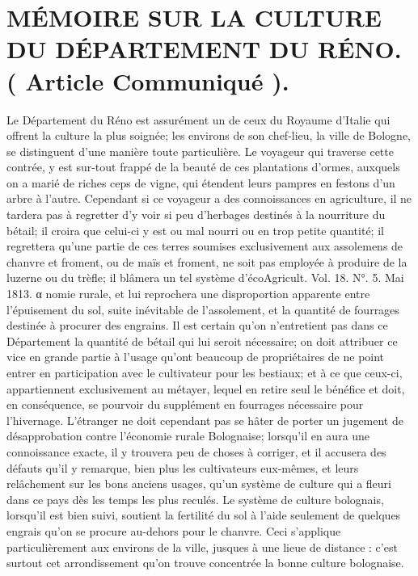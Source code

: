 \setcounter{page}{161}
\section{MÉMOIRE SUR LA CULTURE DU DÉPARTEMENT DU RÉNO. ( Article Communiqué ).}
Le Département du Réno est assurément un de ceux du Royaume d'Italie qui offrent la culture la plus soignée; les environs de son chef-lieu, la ville de Bologne, se distinguent d'une manière toute particulière. Le voyageur qui traverse cette contrée, y est sur-tout frappé de la beauté de ces plantations d'ormes, auxquels on a marié de riches ceps de vigne, qui étendent leurs pampres en festons d'un arbre à l'autre. Cependant si ce voyageur a des connoissances en agriculture, il ne tardera pas à regretter d'y voir si peu d'herbages destinés à la nourriture du bétail; il croira que celui-ci y est ou mal nourri ou en trop petite quantité; il regrettera qu'une partie de ces terres soumises exclusivement aux assolemens de chanvre et froment, ou de maïs et froment, ne soit pas employée à produire de la luzerne ou du trèfle; il blâmera un tel système d'écoAgricult. Vol. 18. N°. 5. Mai 1813. α\setcounter{page}{162} nomie rurale, et lui reprochera une disproportion apparente entre l'épuisement du sol, suite inévitable de l'assolement, et la quantité de fourrages destinée à procurer des engrains.
Il est certain qu'on n'entretient pas dans ce Département la quantité de bétail qui lui seroit nécessaire; on doit attribuer ce vice en grande partie à l'usage qu'ont beaucoup de propriétaires de ne point entrer en participation avec le cultivateur pour les bestiaux; et à ce que ceux-ci, appartiennent exclusivement au métayer, lequel en retire seul le bénéfice et doit, en conséquence, se pourvoir du supplément en fourrages nécessaire pour l'hivernage. L'étranger ne doit cependant pas se hâter de porter un jugement de désapprobation contre l'économie rurale Bolognaise; lorsqu'il en aura une connoissance exacte, il y trouvera peu de choses à corriger, et il accusera des défauts qu'il y remarque, bien plus les cultivateurs eux-mêmes, et leurs relâchement sur les bons anciens usages, qu'un système de culture qui a fleuri dans ce pays dès les temps les plus reculés. Le système de culture bolognais, lorsqu'il est bien suivi, soutient la fertilité du sol à l'aide seulement de quelques engrais qu'on se procure au-dehors pour le chanvre.\setcounter{page}{163} Ceci s'applique particulièrement aux environs de la ville, jusques à une lieue de distance : c'est surtout cet arrondissement qu'on trouve concentrée la bonne culture bolognaise.
